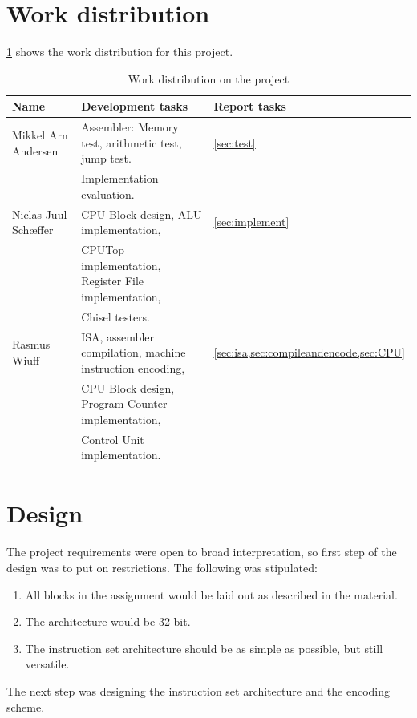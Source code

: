 \documentclass[a4paper, english]{article}
\numberwithin{equation}{section}
\begin{document}
\section{Work distribution}
\cref{tbl:ansvar} shows the work distribution for this project.
\begin{table}[H]
    \centering
    \caption{Work distribution on the project}\label{tbl:ansvar}
    \begin{tabular}{lll}
        \toprule
        Name                 & Development tasks                                         & Report tasks                                \\
        \midrule
        Mikkel Arn Andersen  & Assembler: Memory test, arithmetic test, jump test.       & \cref{sec:test}                             \\
                             & Implementation evaluation.                                &                                             \\
        \midrule
        Niclas Juul Schæffer & CPU Block design, ALU implementation,                     & \cref{sec:implement}                        \\
                             & CPUTop implementation, Register File implementation,      &                                             \\
                             & Chisel testers.                                           &                                             \\
        \midrule
        Rasmus Wiuff         & ISA, assembler compilation, machine instruction encoding, & \cref{sec:isa,sec:compileandencode,sec:CPU} \\
                             & CPU Block design, Program Counter implementation,         &                                             \\
                             & Control Unit implementation.                              &                                             \\
        \bottomrule
    \end{tabular}
\end{table}
\section{Design}
The project requirements were open to broad interpretation, so first step of the design was to put on restrictions. The following was stipulated:
\begin{enumerate}
    \item All blocks in the assignment would be laid out as described in the material.
    \item The architecture would be 32-bit.
    \item The instruction set architecture should be as simple as possible, but still versatile.
\end{enumerate}
The next step was designing the instruction set architecture and the encoding scheme.
\end{document}
